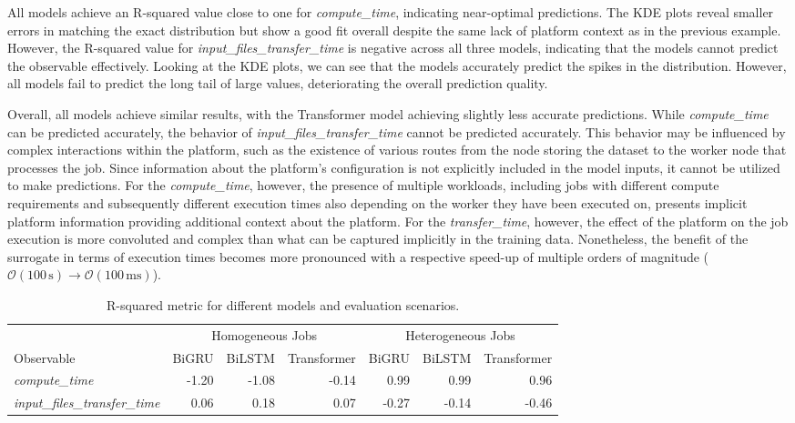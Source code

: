 %
All models achieve an R-squared value close to one for \textit{compute\_time}, indicating near-optimal predictions. 
%
The KDE plots reveal smaller errors in matching the exact distribution but show a good fit overall despite the same lack of platform context as in the previous example. 
%
However, the R-squared value for \textit{input\_files\_transfer\_time} is negative across all three models, indicating that the models cannot predict the observable effectively. 
%
Looking at the KDE plots, we can see that the models accurately predict the spikes in the distribution. 
%
However, all models fail to predict the long tail of large values, deteriorating the overall prediction quality.


Overall, all models achieve similar results, with the Transformer model achieving slightly less accurate predictions. 
%
While \textit{compute\_time} can be predicted accurately, the behavior of \textit{input\_files\_transfer\_time} cannot be predicted accurately. 
%
This behavior may be influenced by complex interactions within the platform, such as the existence of various routes from the node storing the dataset to the worker node that processes the job. Since information about the platform's configuration is not explicitly included in the model inputs, it cannot be utilized to make predictions.
For the \textit{compute\_time}, however, the presence of multiple workloads, including jobs with different compute requirements and subsequently different execution times also depending on the worker they have been executed on, presents implicit platform information providing additional context about the platform.
For the \textit{transfer\_time}, however, the effect of the platform on the job execution is more convoluted and complex than what can be captured implicitly in the training data.
%
Nonetheless, the benefit of the surrogate in terms of execution times becomes more pronounced with a respective speed-up of multiple orders of magnitude ($\mathcal{O}(100\,\mathrm{s}) \to \mathcal{O}(100\,\mathrm{ms})$).
%
\begin{table}
    \centering%
    \caption{R-squared metric for different models and evaluation scenarios.}%
    \begin{adjustbox}{width=\linewidth}%
    \begin{tabular}{l|rrr|rrr}
    & \multicolumn{3}{c}{Homogeneous Jobs} & \multicolumn{3}{c}{Heterogeneous Jobs} \\
    Observable & BiGRU & BiLSTM & Transformer & BiGRU & BiLSTM & Transformer\\ \toprule
    \textit{compute\_time} & -1.20 & -1.08 & -0.14 & 0.99 & 0.99 & 0.96 \\
    \textit{input\_files\_transfer\_time} & 0.06 & 0.18 & 0.07 & -0.27 & -0.14 & -0.46 \\ \bottomrule
    \end{tabular}%
    \end{adjustbox}%
    \label{tab:eval}%
\end{table}%
%